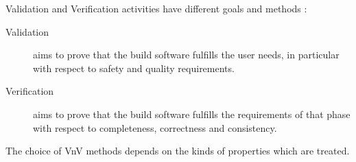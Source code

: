 \documentclass{template/openetcs_article}
\begin{document}
 


Validation and Verification activities have different goals and methods :
\begin{description}
\item [Validation] aims to prove that the build software fulfills the user needs, in particular with respect to safety and quality requirements.
\item [Verification] aims to prove that the build software fulfills the requirements of that
phase with respect to completeness, correctness and consistency.
\end{description}



The choice of VnV methods depends on the kinds of properties which are treated.


\end{document}
